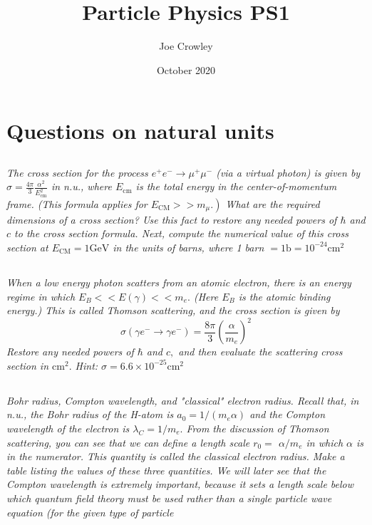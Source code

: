 \documentclass{article}
\title{Particle Physics PS1}
\author{Joe Crowley}
\date{October 2020}
\begin{document}
  


\section{Questions on natural units}

\subsection{}
\textit{The cross section for the process $e^{+} e^{-} \rightarrow \mu^{+} \mu^{-}$ (via a virtual photon) is given by $\sigma=\frac{4 \pi}{3} \frac{\alpha^{2}}{E_{\mathrm{cm}}^{2}}$ in n.u., where $E_{\mathrm{cm}}$ is the total energy in the center-of-momentum frame. (This formula applies for $\left.E_{\mathrm{CM}}>>m_{\mu} .\right)$ What are the required dimensions of a cross section? Use this fact to restore any needed powers of $\hbar$ and $c$ to the cross section formula. Next, compute the numerical value of this cross section at $E_{\mathrm{CM}}=1 \mathrm{GeV}$ in the units of barns, where 1 barn $=1 \mathrm{b}=10^{-24} \mathrm{cm}^{2}$}


\subsection{}
\textit{When a low energy photon scatters from an atomic electron, there is an energy regime in which $E_{B}<<E(\gamma)<<m_{e} .$ (Here $E_{B}$ is the atomic binding energy.) This is called Thomson scattering, and the cross section is given by
$$
\sigma\left(\gamma e^{-} \rightarrow \gamma e^{-}\right)=\frac{8 \pi}{3}\left(\frac{\alpha}{m_{e}}\right)^{2}
$$
Restore any needed powers of $\hbar$ and $c,$ and then evaluate the scattering cross section in $\mathrm{cm}^{2} .$ Hint: $\sigma=6.6 \times 10^{-25} \mathrm{cm}^{2}$}


\subsection{}
\textit{Bohr radius, Compton wavelength, and "classical" electron radius. Recall that, in n.u., the Bohr radius of the H-atom is $a_{0}=1 /\left(m_{e} \alpha\right)$ and the Compton wavelength of the electron is $\lambda_{C}=1 / m_{e} .$ From the discussion of Thomson scattering, you can see that we can define a length scale $r_{0}=$ $\alpha / m_{e}$ in which $\alpha$ is in the numerator. This quantity is called the classical electron radius. Make a table listing the values of these three quantities. We will later see that the Compton wavelength is extremely important, because it sets a length scale below which quantum field theory must be used rather than a single particle wave equation (for the given type of particle}
\end{document}
